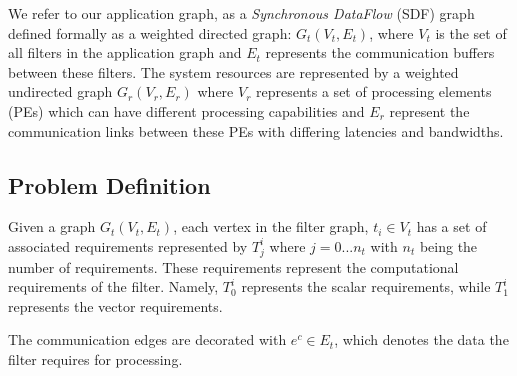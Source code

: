 \documentclass[10pt, conference, compsocconf]{IEEEtran}
\begin{document}
We refer to our application graph, as a \textit{Synchronous DataFlow }
(SDF) graph defined formally as a weighted directed graph: $G_t(V_t,
E_t)$, where $V_t$ is the set of all filters in the application graph
and $E_t$ represents the communication buffers between these
filters. The system resources are represented by a weighted undirected
graph $G_r(V_r, E_r)$ where $V_r$ represents a set of processing
elements (PEs) which can have different processing capabilities and
$E_r$ represent the communication links between these PEs with differing
latencies and bandwidths. %

\subsection{Problem Definition}

Given a graph $G_t(V_t, E_t)$, each vertex in the filter graph, $t_i \in
V_t$ has a set of associated requirements represented by $T^{i}_{j}$
where $j=0...n_t$ with $n_t$ being the number of requirements. These
requirements represent the computational requirements of the
filter. Namely, $T^i_0$ represents the scalar requirements, while
$T^i_1$ represents the vector requirements.


The communication edges are decorated with \mbox{$e^c \in E_t$}, which
denotes the data the filter requires for processing.
\end{document}
